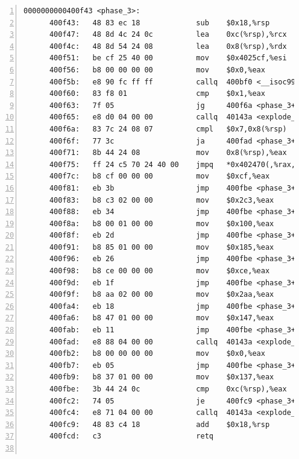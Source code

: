 \documentclass{article}
\begin{document}
\begin{lstlisting}[title = bomb的反汇编代码及部分注释, xleftmargin = 2em,xrightmargin = 2em, aboveskip = 1em, numbers = left, basicstyle=\scriptsize\ttfamily, numberstyle=\scriptsize]
    0000000000400f43 <phase_3>:
      400f43:	48 83 ec 18          	sub    $0x18,%rsp					; %rsp -= 0x18;
      400f47:	48 8d 4c 24 0c       	lea    0xc(%rsp),%rcx				; %rcx = %rsp + 0xc;
      400f4c:	48 8d 54 24 08       	lea    0x8(%rsp),%rdx				; %rdx = %rsp + 0x8;
      400f51:	be cf 25 40 00       	mov    $0x4025cf,%esi				; %esi = 0x4025cf;
      400f56:	b8 00 00 00 00       	mov    $0x0,%eax					; %eax = 0;
      400f5b:	e8 90 fc ff ff       	callq  400bf0 <__isoc99_sscanf@plt>	; sscanf(...)
      400f60:	83 f8 01             	cmp    $0x1,%eax					; if (%eax > 1)
      400f63:	7f 05                	jg     400f6a <phase_3+0x27>		;	  goto #393;
      400f65:	e8 d0 04 00 00       	callq  40143a <explode_bomb>		; explode_bomb;
      400f6a:	83 7c 24 08 07       	cmpl   $0x7,0x8(%rsp)				; if (M[%rsp + 0x8] > 7)
      400f6f:	77 3c                	ja     400fad <phase_3+0x6a>		;	  goto #411;
      400f71:	8b 44 24 08          	mov    0x8(%rsp),%eax				; %eax = M[%rsp + 0x8];
      400f75:	ff 24 c5 70 24 40 00 	jmpq   *0x402470(,%rax,8)			; goto 8 * %rax + 0x402470;
      400f7c:	b8 cf 00 00 00       	mov    $0xcf,%eax				; 0:  %eax = 0xcf;
      400f81:	eb 3b                	jmp    400fbe <phase_3+0x7b>		; goto #415;
      400f83:	b8 c3 02 00 00       	mov    $0x2c3,%eax				; 2:  %eax = 0x2c3;	
      400f88:	eb 34                	jmp    400fbe <phase_3+0x7b>		; goto #415;
      400f8a:	b8 00 01 00 00       	mov    $0x100,%eax				; 3:  %eax = 0x100;
      400f8f:	eb 2d                	jmp    400fbe <phase_3+0x7b>		; goto #415;
      400f91:	b8 85 01 00 00       	mov    $0x185,%eax				; 4:  %eax = 0x185;
      400f96:	eb 26                	jmp    400fbe <phase_3+0x7b>		; goto #415;
      400f98:	b8 ce 00 00 00       	mov    $0xce,%eax				; 5:  %eax = 0xce;
      400f9d:	eb 1f                	jmp    400fbe <phase_3+0x7b>		; goto #415;
      400f9f:	b8 aa 02 00 00       	mov    $0x2aa,%eax				; 6:  %eax = 0x2aa;
      400fa4:	eb 18                	jmp    400fbe <phase_3+0x7b>		; goto #415;
      400fa6:	b8 47 01 00 00       	mov    $0x147,%eax				; 7:  %eax = 0x147;
      400fab:	eb 11                	jmp    400fbe <phase_3+0x7b>		; goto #415;
      400fad:	e8 88 04 00 00       	callq  40143a <explode_bomb>		; explode_bomb(...);
      400fb2:	b8 00 00 00 00       	mov    $0x0,%eax					; %eax = 0;
      400fb7:	eb 05                	jmp    400fbe <phase_3+0x7b>		; goto #415;
      400fb9:	b8 37 01 00 00       	mov    $0x137,%eax				; 1:  %eax = 0x137;
      400fbe:	3b 44 24 0c          	cmp    0xc(%rsp),%eax				; if (%eax == M[%rsp + 0xc])
      400fc2:	74 05                	je     400fc9 <phase_3+0x86>		;	  goto #418;
      400fc4:	e8 71 04 00 00       	callq  40143a <explode_bomb>		; explode_bomb(...);
      400fc9:	48 83 c4 18          	add    $0x18,%rsp					; %rsp += 0x18;
      400fcd:	c3                   	retq								; return;
    

\end{lstlisting}
\end{document}
